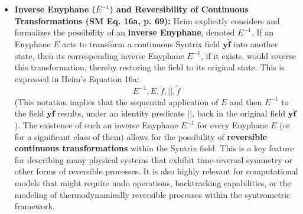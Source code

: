 \documentclass[12pt]{article}
\newcommand{\enyphane}{E}
\begin{document}
\begin{itemize}
    \item \textbf{Inverse Enyphane (\(\enyphane^{-1}\)) and Reversibility of Continuous Transformations (SM Eq. 16a, p. 69):}
    Heim explicitly considers and formalizes the possibility of an \textbf{inverse Enyphane}, denoted \( \enyphane^{-1} \). If an Enyphane \( \enyphane \) acts to transform a continuous Syntrix field \( \mathbf{y\widetilde{f}} \) into another state, then its corresponding inverse Enyphane \( \enyphane^{-1} \), if it exists, would reverse this transformation, thereby restoring the field to its original state. This is expressed in Heim's Equation 16a:
    \begin{equation}
    E^{-1}, E, \widetilde{f}, \overline{||}, \widetilde{f}
    \label{eq:original_inverse_enyphane}
    \end{equation}
    (This notation implies that the sequential application of \( \enyphane \) and then \( \enyphane^{-1} \) to the field \( \mathbf{y\widetilde{f}} \) results, under an identity predicate \( \overline{||} \), back in the original field \( \mathbf{y\widetilde{f}} \)). The existence of such an inverse Enyphane \( \enyphane^{-1} \) for every Enyphane \( \enyphane \) (or for a significant class of them) allows for the possibility of \textbf{reversible continuous transformations} within the Syntrix field. This is a key feature for describing many physical systems that exhibit time-reversal symmetry or other forms of reversible processes. It is also highly relevant for computational models that might require undo operations, backtracking capabilities, or the modeling of thermodynamically reversible processes within the syntrometric framework.


\end{itemize}
\end{document}
